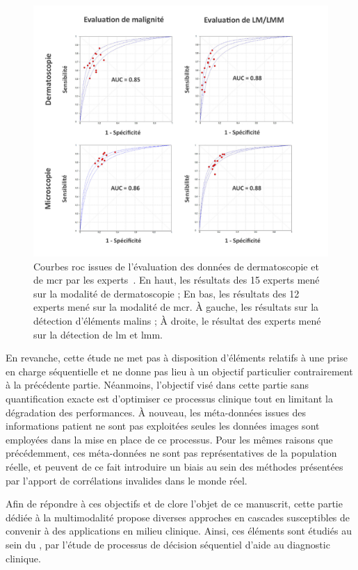 \begin{figure}[H]
    \begin{center}
        \includegraphics[width=\linewidth]{contents/iii_preamble_multimodal/resources/results_roc_experts.pdf}
        \caption{Courbes \gls{roc} issues de l'évaluation des données de dermatoscopie et de \gls{mcr} par les experts~\cite{Cinotti2018}. En haut, les résultats des 15 experts mené sur la modalité de dermatoscopie ; En bas, les résultats des 12 experts mené sur la modalité de \gls{mcr}. À gauche, les résultats sur la détection d'éléments malins ; À droite, le résultat des experts mené sur la détection de \gls{lm} et \gls{lmm}.}
        \label{fig:results_roc_experts}
    \end{center} 
\end{figure}\par

En revanche, cette étude ne met pas à disposition d'éléments relatifs à une prise en charge séquentielle et ne donne pas lieu à un objectif particulier contrairement à la précédente partie. Néanmoins, l'objectif visé dans cette partie sans quantification exacte est d'optimiser ce processus clinique tout en limitant la dégradation des performances. À nouveau, les méta-données issues des informations patient ne sont pas exploitées seules les données images sont employées dans la mise en place de ce processus. Pour les mêmes raisons que précédemment, ces méta-données ne sont pas représentatives de la population réelle, et peuvent de ce fait introduire un biais au sein des méthodes présentées par l'apport de corrélations invalides dans le monde réel.\par

Afin de répondre à ces objectifs et de clore l'objet de ce manuscrit, cette partie dédiée à la multimodalité propose diverses approches en cascades susceptibles de convenir à des applications en milieu clinique. Ainsi, ces éléments sont étudiés au sein du , par l'étude de processus de décision séquentiel d'aide au diagnostic clinique.\par
